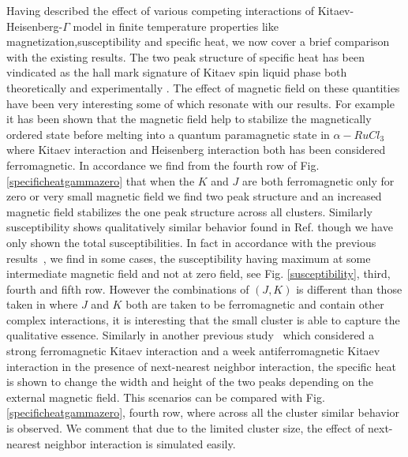 \documentclass[aps,amsmath,twocolumn,amssymb,floatfix,showpacs,superscriptaddress,nofootinbib,longbibliography]{revtex4-1}
\begin{document}
 Having described the effect of various competing interactions of Kitaev-Heisenberg-$\Gamma$ model in finite temperature properties like magnetization,susceptibility and specific heat, we now cover a brief comparison with the existing results. The two peak structure of specific heat has been vindicated as the
hall mark signature of Kitaev spin liquid phase both theoretically and experimentally \cite{kataoka-jpsj-2020,andrade-2020,tathagata-2020,bachus-2021,balz-prb-2021,feng-2020,yogesh-2017,nasu-2015,yamaji-2016}.
The effect of magnetic field on these quantities have been very interesting some of which resonate with our
results. For example it has been shown that  the magnetic field help  to stabilize the 
magnetically ordered state before melting into a quantum paramagnetic state in $\alpha-RuCl_3$\cite{balz-prb-2021} where Kitaev interaction and Heisenberg interaction both has been considered ferromagnetic. In
accordance we find from the fourth row of Fig. \ref{specificheatgammazero} that when the $K$ and $J$ are both ferromagnetic only for zero or very small magnetic field we find two peak structure and an increased magnetic field stabilizes the one peak structure across all clusters. Similarly susceptibility shows qualitatively similar behavior found in Ref.  though we have only shown the total susceptibilities. In fact in accordance with the previous results~\cite{andrade-2020}, we find in some cases, the susceptibility having maximum at some intermediate magnetic field and not at zero field, see Fig. \ref{susceptibility}, third, fourth and fifth row. However the combinations of $(J,K)$ is different than those taken in  where $J$ and $K$ both are taken to be ferromagnetic and contain other complex interactions, it is interesting that the small cluster is able to capture the qualitative essence\cite{kataoka-jpsj-2020}. Similarly in another previous study~\cite{yamaji-2016} which considered a strong ferromagnetic Kitaev interaction and a week antiferromagnetic Kitaev interaction in the presence of next-nearest neighbor interaction, the specific heat is shown to change the width and height of the two peaks depending on the external magnetic field. This scenarios can be compared with Fig. \ref{specificheatgammazero}, fourth row, where across all the cluster similar behavior is observed. We comment that due to the limited cluster size, the  effect of next-nearest neighbor interaction is simulated easily.
\end{document}
